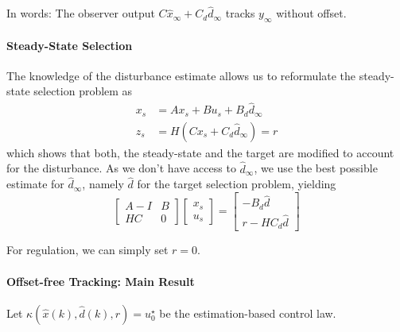 In words: The observer output $C \widehat{x}_\infty + C_d \widehat{d}_\infty$ tracks $y_\infty$ without offset.

\paragraph{Steady-State Selection}
The knowledge of the disturbance estimate allows us to reformulate the steady-state selection problem as
\begin{align*}
    x_s & = Ax_s + Bu_s + B_d \widehat{d}_\infty \\
    z_s & = H(Cx_s + C_d \widehat{d}_\infty) = r
\end{align*}
which shows that both, the steady-state and the target are modified to account for the disturbance.
\newpar{}
As we don't have access to $\widehat{d}_\infty$, we use the best possible estimate for $\widehat{d}_\infty$, namely $\widehat{d}$ for the target selection problem, yielding
\begin{equation*}
    \begin{bmatrix}
        A - I & B \\
        HC    & 0
    \end{bmatrix}
    \begin{bmatrix}
        x_s \\
        u_s
    \end{bmatrix}
    =
    \begin{bmatrix}
        - B_d \widehat{d} \\
        r - HC_d \widehat{d}
    \end{bmatrix}
\end{equation*}

For regulation, we can simply set $r=0$.

\paragraph{Offset-free Tracking: Main Result}

Let $\kappa(\widehat{x}(k), \widehat{d}(k), r) = u_0^\star$ be the estimation-based control law.

